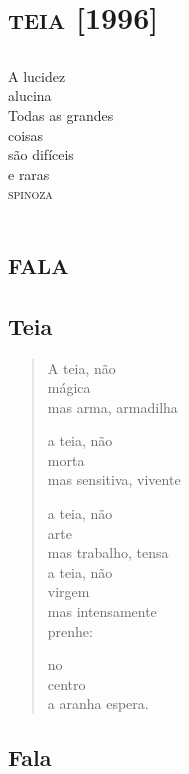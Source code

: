 \part{\textsc{teia} {[}1996{]}}

\chapter*{}
\thispagestyle{empty}
\mbox{}
\vspace*{\fill}


\epigraph{A lucidez\\
alucina\\\bigskip\bigskip
Todas as grandes\\
coisas\\
são difíceis\\
e raras\\
\textsc{spinoza}}{}
\vspace*{\fill}

\part*{\textsc{fala}}

\chapter{Teia}

\begin{verse}
A teia, não\\
mágica\\
mas arma, armadilha

a teia, não\\
morta\\
mas sensitiva, vivente

a teia, não\\
arte\\
mas trabalho, tensa\\

a teia, não\\
virgem\\
mas intensamente\\
\qquad\qquad prenhe:

no\\
centro\\
a aranha espera.
\end{verse}

\chapter{Fala}

